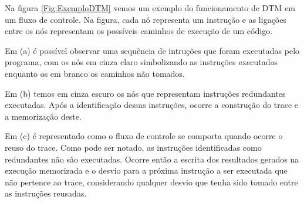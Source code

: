 Na figura \ref{Fig:ExemploDTM} vemos um exemplo do funcionamento de DTM em um fluxo de controle. Na figura, cada nó representa um instrução e as ligações entre os nós representam os possíveis caminhos de execução de um código. 

Em (a) é possível observar uma sequência de intruções que foram executadas pelo programa, com os nós em cinza claro simbolizando as instruções executadas enquanto os em branco os caminhos não tomados.

Em (b) temos em cinza escuro os nós que representam instruções redundantes executadas. Após a identificação dessas instruções, ocorre a construção do trace e a memorização deste.

Em (c) é representado como o fluxo de controle se comporta quando ocorre o reuso do trace. Como pode ser notado, as instruções identificadas como redundantes não são executadas. Ocorre então a escrita dos resultados gerados na execução memorizada e o desvio para a próxima instrução a ser executada que não pertence ao trace, considerando qualquer desvio que tenha sido tomado entre as instruções reusadas.

